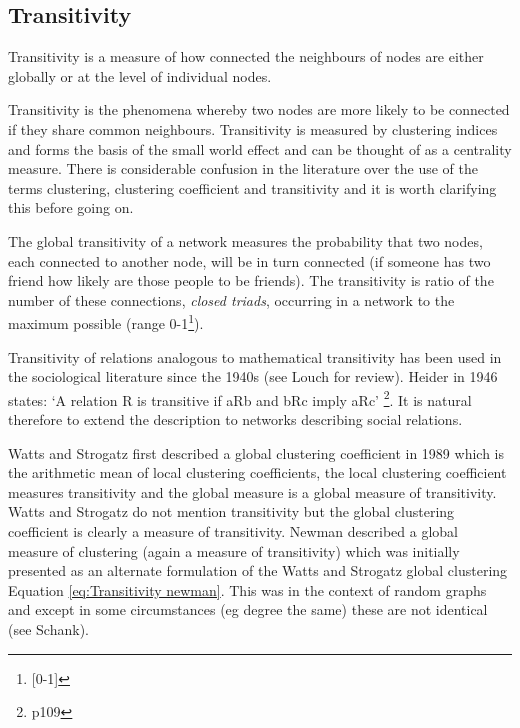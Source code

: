  





\subsection{Transitivity}
\label{sec:transitivity}
Transitivity is a measure of how connected the neighbours of nodes are either globally or at the level of individual nodes. 

Transitivity is the phenomena whereby two nodes are more likely to be connected if they share common neighbours. Transitivity is measured by clustering indices and forms the basis of the small world effect and can be thought of as a centrality measure. There is considerable confusion in the literature over the use of the terms clustering, clustering coefficient and transitivity and it is worth clarifying this before going on. 

The global transitivity of a network measures the probability that two nodes, each connected to another node, will be in turn connected (if someone has two friend how likely are those people to be friends). The transitivity is ratio of the number of these connections, \textit{closed triads}, occurring in a network to the maximum possible (range 0-1\footnote{[0-1]}).

Transitivity of relations analogous to mathematical transitivity has been used in the sociological literature since the 1940s\cite{louch2000personal} (see Louch for review). Heider in 1946 states: `A relation R is transitive if aRb and bRc imply aRc' \cite{heider1946attitudes}\footnote{p109}. It is natural therefore to extend the description to networks describing social relations. 

Watts and Strogatz first described a global clustering coefficient in 1989\cite{watts1998collective} which is the arithmetic mean of local clustering coefficients, the local clustering coefficient measures transitivity and the global measure is a global measure of transitivity. Watts and Strogatz do not mention transitivity but the global clustering coefficient is clearly a measure of transitivity. Newman described a global measure of clustering (again a measure of transitivity) which was initially presented as an alternate formulation of the Watts and Strogatz global clustering Equation \ref{eq:Transitivity newman}\cite{newman2002assortative}. This was in the context of random graphs and except in some circumstances (eg degree the same) these are not identical (see Schank\cite{schank2005approximating}).

